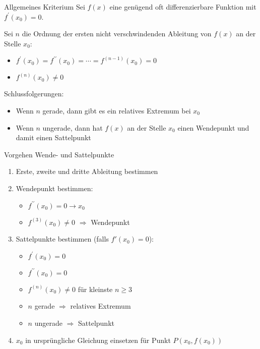 \begin{concept}{Allgemeines Kriterium}
    Sei $f(x)$ eine genügend oft differenzierbare Funktion mit $f^{\prime}\left(x_{0}\right)=0$.

    Sei $n$ die Ordnung der ersten nicht verschwindenden Ableitung von $f(x)$ an der Stelle $x_{0}$:
    \begin{itemize}
      \item $f^{\prime}\left(x_{0}\right)=f^{\prime \prime}\left(x_{0}\right)=\cdots=f^{(n-1)}\left(x_{0}\right)=0$
      \item $f^{(n)}\left(x_{0}\right) \neq 0$
    \end{itemize}

    Schlussfolgerungen:
    \begin{itemize}
        \item Wenn $n$ gerade, dann gibt es ein relatives Extremum bei $x_0$
        \item Wenn $n$ ungerade, dann hat $f(x)$ an der Stelle $x_{0}$ einen Wendepunkt und damit einen Sattelpunkt
    \end{itemize}
\end{concept}

\begin{KR}{Vorgehen Wende- und Sattelpunkte}
    \begin{enumerate}
      \item Erste, zweite und dritte Ableitung bestimmen
      \item Wendepunkt bestimmen:
        \begin{itemize}
          \item $f^{\prime \prime}\left(x_{0}\right)=0 \rightarrow x_{0}$
          \item $f^{(3)}\left(x_{0}\right) \neq 0$ $\Rightarrow$ Wendepunkt
        \end{itemize}
      \item Sattelpunkte bestimmen (falls $f'(x_0) = 0$):
        \begin{itemize}
          \item $f^{\prime}\left(x_{0}\right)=0$
          \item $f^{\prime \prime}\left(x_{0}\right)=0$
          \item $f^{(n)}\left(x_{0}\right) \neq 0$ für kleinste $n \geq 3$
          \item $n$ gerade $\Rightarrow$ relatives Extremum
          \item $n$ ungerade $\Rightarrow$ Sattelpunkt
        \end{itemize}
      \item $x_{0}$ in ursprüngliche Gleichung einsetzen für Punkt $P(x_0, f(x_0))$
    \end{enumerate}
\end{KR}

